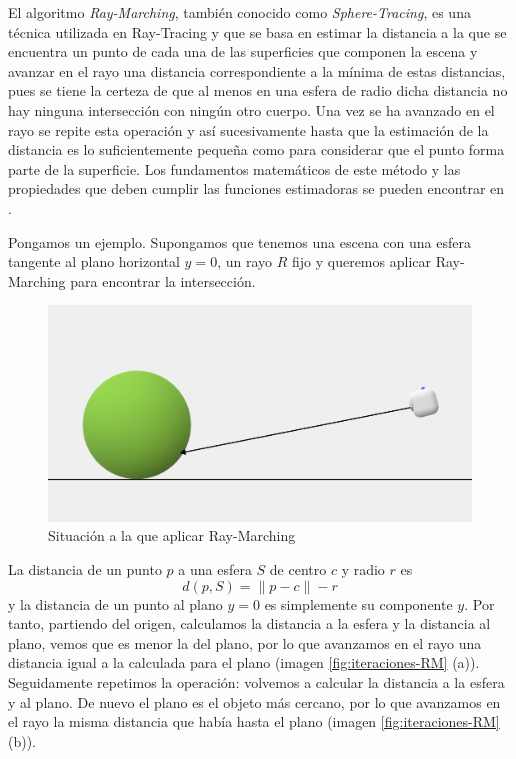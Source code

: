 El algoritmo \textit{Ray-Marching}, también conocido como \textit{Sphere-Tracing}, es una técnica utilizada en Ray-Tracing y que se basa en estimar la distancia a la que se encuentra un punto de cada una de las superficies que componen la escena y avanzar en el rayo una distancia correspondiente a la mínima de estas distancias, pues se tiene la certeza de que al menos en una esfera de radio dicha distancia no hay ninguna intersección con ningún otro cuerpo. Una vez se ha avanzado en el rayo se repite esta operación y así sucesivamente hasta que la estimación de la distancia es lo suficientemente pequeña como para considerar que el punto forma parte de la superficie. Los fundamentos matemáticos de este método y las propiedades que deben cumplir las funciones estimadoras se pueden encontrar en \cite{Hart-1995}. 

Pongamos un ejemplo. Supongamos que tenemos una escena con una esfera tangente al plano horizontal $y=0$, un rayo $R$ fijo y queremos aplicar Ray-Marching para encontrar la intersección.

\begin{figure} [ht]
    \centering
    \includegraphics[scale = 0.2]{img/C8/situacion-inicial.png}
    \caption{Situación a la que aplicar Ray-Marching}
    \label{fig:RM-inicial}
\end{figure}

La distancia de un punto $p$ a una esfera $S$ de centro $c$ y radio $r$ es 
\begin{equation}
    \label{eq:distancia-punto-esfera}
    d(p,S) = \|p-c\| - r 
\end{equation}
y la distancia de un punto al plano $y=0$ es simplemente su componente $y$. Por tanto, partiendo del origen, calculamos la distancia a la esfera y la distancia al plano, vemos que es menor la del plano, por lo que avanzamos en el rayo una distancia igual a la calculada para el plano (imagen \ref{fig:iteraciones-RM} (a)). Seguidamente repetimos la operación: volvemos a calcular la distancia a la esfera y al plano. De nuevo el plano es el objeto más cercano, por lo que avanzamos en el rayo la misma distancia que había hasta el plano (imagen \ref{fig:iteraciones-RM} (b)).


